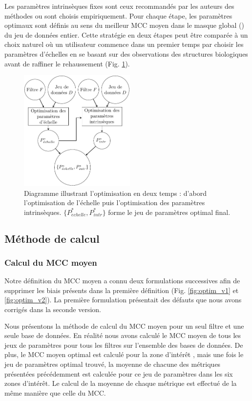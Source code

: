 Les paramètres intrinsèques fixes sont ceux recommandés par les auteurs des méthodes ou sont choisis empiriquement.  Pour chaque étape, les paramètres optimaux sont définis au sens du meilleur MCC moyen dans le masque global (\maskglobal) du jeu de données entier. Cette stratégie en deux étapes peut être comparée à un choix naturel où un utilisateur commence dans un premier temps par choisir les paramètres d'échelles en se basant sur des observations des structures biologiques avant de raffiner le rehaussement (Fig. \ref{fig:flowchart_opti}).

\begin{figure}[!ht]
  \centering
  \includegraphics[height=6cm]{Images/flowchart_benchmark.pdf}
  \caption{Diagramme illustrant l'optimisation en deux temps : d'abord l'optimisation de l'échelle puis l'optimisation des paramètres intrinsèques. $\{P^*_{\acute{e}chelle},P^*_{intr}\}$ forme le jeu de paramètres optimal final.}
  \label{fig:flowchart_opti}
\end{figure}


\subsection{Méthode de calcul}
\subsubsection{Calcul du MCC moyen}

  Notre définition du MCC moyen a connu deux formulations successives afin de supprimer les biais présents dans la première définition (Fig. \ref{fig:optim_v1} et \ref{fig:optim_v2}). La première formulation présentait des défauts que nous avons corrigés dans la seconde version.
  
  Nous présentons la méthode de calcul du MCC moyen pour un  seul filtre et une seule base de données. En réalité nous avons calculé le MCC moyen de tous les jeux de paramètres pour tous les filtres sur l'ensemble des bases de données. De plus, le MCC moyen optimal est calculé pour la zone d'intérêt \maskglobal, mais une fois le jeu de paramètres optimal trouvé, la moyenne de chacune des métriques présentées précédemment est calculée pour ce jeu de paramètres dans les six zones d'intérêt. Le calcul de la moyenne de chaque métrique est effectué de la même manière que celle du MCC.    

